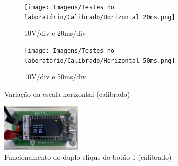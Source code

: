 \begin{figure}[H]\ContinuedFloat
    \centering
    \begin{subfigure}{0.35\textwidth}
        \centering
        \texttt{[image: Imagens/Testes no laboratório/Calibrado/Horizontal 20ms.png]}
        \captionsetup{justification=centering}
        \caption{10V/div e 20ms/div}
        \label{fig:10V/div e 20ms/div horizontal calibrado}
    \end{subfigure}
    \begin{subfigure}{0.35\textwidth}
        \centering
        \texttt{[image: Imagens/Testes no laboratório/Calibrado/Horizontal 50ms.png]}
        \captionsetup{justification=centering}
        \caption{10V/div e 50ms/div}
        \label{fig:10V/div e 50ms/div calibrado}
    \end{subfigure}
    \captionsetup{justification=centering}
    \caption{Variação da escala horizontal (calibrado)}
    \label{fig:Variação da escala horizontal (calibrado)}
\end{figure}

\vspace{-0.4cm}

\begin{figure}[H]
    \centering
    \includegraphics[width=0.35\textwidth]{Imagens/Testes no laboratório/Calibrado/Botão 13.jpeg}
    \captionsetup{justification=centering}
    \caption{Funcionamento do duplo clique do botão 1 (calibrado)}
    \label{fig:Funcionamento do duplo clique do botão 1 (calibrado)}
\end{figure}

\vspace{-0.4cm}

